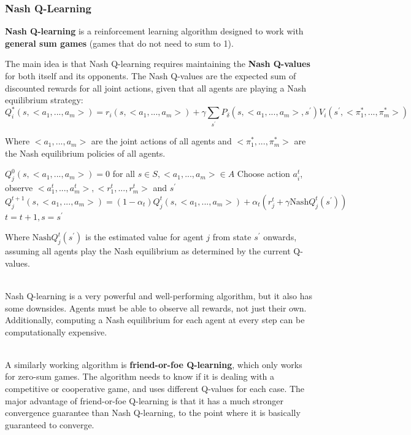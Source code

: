 \documentclass[12pt]{article}
\begin{document}
\subsubsection{Nash Q-Learning}
\textbf{Nash Q-learning} is a reinforcement learning algorithm designed to work with \textbf{general sum games} (games that do not need to sum to 1).

\newpage
\noindent
The main idea is that Nash Q-learning requires maintaining the \textbf{Nash Q-values} for both itself and its opponents.
The Nash Q-values are the expected sum of discounted rewards for all joint actions, given that all agents are playing a Nash equilibrium strategy:
\[ Q^*_i(s, <a_1, ... , a_m>) = r_i(s, <a_1, ... , a_m>) + \gamma \sum_{s^\prime} P_\delta(s, <a_1, ... , a_m>, s^\prime) V_i(s^\prime, <\pi^*_1, ... , \pi^*_m>) \]

\noindent
Where $<a_1, ... , a_m>$ are the joint actions of all agents and $<\pi^*_1, ... , \pi^*_m>$ are the Nash equilibrium policies of all agents.

\begin{algorithm}
    \caption{Nash Q-Learning}
    \begin{algorithmic}[1]
        \State $Q^0_j(s, <a_1, ... , a_m>) = 0$ for all $s \in S, <a_1, ... , a_m> \in A$
            \State Choose action $a^t_i$, observe $<a^t_1, ... , a^t_m>, <r^t_1, ... , r^t_m>$ and $s^\prime$
            \State $Q^{t + 1}_j(s, <a_1, ... , a_m>) = (1 - \alpha_t)Q^t_j(s, <a_1, ... , a_m>) + \alpha_t (r^t_j + \gamma \text{Nash}Q^t_j(s^\prime))$
            \State $t = t + 1, s = s^\prime$
        \EndWhile
    \end{algorithmic}
\end{algorithm}

\noindent
Where $\text{Nash}Q^t_j(s^\prime)$ is the estimated value for agent $j$ from state $s^\prime$ onwards, assuming all agents play the Nash equilibrium as determined by the current Q-values.

\noindent
\\
Nash Q-learning is a very powerful and well-performing algorithm, but it also has some downsides.
Agents must be able to observe all rewards, not just their own.
Additionally, computing a Nash equilibrium for each agent at every step can be computationally expensive.

\noindent
\\
A similarly working algorithm is \textbf{friend-or-foe Q-learning}, which only works for zero-sum games.
The algorithm needs to know if it is dealing with a competitive or cooperative game, and uses different Q-values for each case.
The major advantage of friend-or-foe Q-learning is that it has a much stronger convergence guarantee than Nash Q-learning, to the point where it is basically guaranteed to converge.
\end{document}
